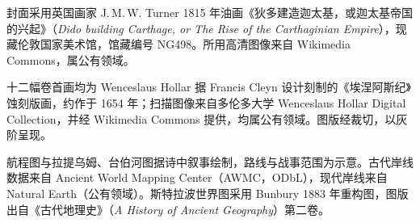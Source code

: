 封面采用英国画家 J.\,M.\,W. Turner 1815 年油画《狄多建造迦太基，或迦太基帝国的兴起》（\textit{Dido building Carthage, or The Rise of the Carthaginian Empire}），现藏伦敦国家美术馆，馆藏编号 NG498。所用高清图像来自 Wikimedia Commons，属公有领域。

十二幅卷首画均为 Wenceslaus Hollar 据 Francis Cleyn 设计刻制的《埃涅阿斯纪》蚀刻版画，约作于 1654 年；扫描图像来自多伦多大学 Wenceslaus Hollar Digital Collection，并经 Wikimedia Commons 提供，均属公有领域。图版经裁切，以灰阶呈现。


\par\addvspace{3mm}\noindent
航程图与拉提乌姆、台伯河图据诗中叙事绘制，路线与战事范围为示意。古代岸线数据来自 Ancient World Mapping Center（AWMC，ODbL），现代岸线来自 Natural Earth（公有领域）。斯特拉波世界图采用 Bunbury 1883 年重构图，图版出自《古代地理史》（\textit{A History of Ancient Geography}）第二卷。
